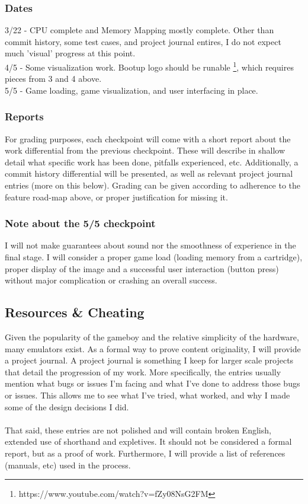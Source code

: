 \documentclass{article}
\begin{document}
        \subsubsection{Dates}
        3/22 - CPU complete and Memory Mapping mostly complete. Other than commit history, some test cases, and project journal entires, I do not expect much 'visual' progress at this point.\\

        4/5 - Some visualization work. Bootup logo should be runable \footnote{https://www.youtube.com/watch?v=fZy08NsG2FM}, which requires pieces from 3 and 4 above. \\

        5/5 - Game loading, game visualization, and user interfacing in place. \\
        
        \subsubsection{Reports}
        For grading purposes, each checkpoint will come with a short report about the work differential from the previous checkpoint. These will describe in shallow detail what specific work has been done, pitfalls experienced, etc. Additionally, a commit history differential will be presented, as well as relevant project journal entries (more on this below). Grading can be given 
        according to adherence to the feature road-map above, or proper justification for missing it.
        
        \subsubsection{Note about the 5/5 checkpoint}
        I will not make guarantees about sound nor the smoothness of experience 
        in the final stage. I will consider a proper
        game load (loading memory from a cartridge), proper display of the image and 
        a successful user interaction (button press) without major complication or crashing 
        an overall success.

               
    \subsection{Resources \& Cheating}
        Given the popularity of the gameboy and the relative simplicity of the hardware, many emulators exist. 
        As a formal way to prove content originality, I will provide a project journal. 
        A project journal is something I keep for larger scale projects that detail the progression of my work. 
        More specifically, the entries usually mention what bugs or issues I'm facing and what I've 
        done to address those bugs or issues. This allows me to see what I've tried, what worked, and why 
        I made some of the design decisions I did. \\
        \\
        That said, these entries are not polished and will contain broken English, extended use of shorthand 
        and expletives. It should not be considered a formal report, but as a proof of work. Furthermore, I will provide a list of references (manuals, etc) used in the process.
\end{document}
